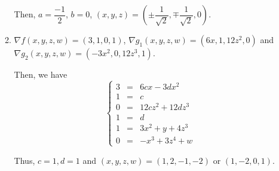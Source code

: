 \documentclass[12pt]{article}
\begin{document}
\begin{enumerate}
\begin{enumerate}
        Then, $a = \dfrac{-1}{2}$, $b = 0$, $(x, y, z) = (\pm \dfrac{1}{\sqrt{2}}, \mp \dfrac{1}{\sqrt{2}}, 0)$.
        
        \item $\nabla f(x, y, z, w) = (3, 1, 0, 1)$, $\nabla g_1(x, y, z, w) = (6x, 1, 12z^2, 0)$ and $\nabla g_2(x, y, z, w) = (-3x^2, 0, 12z^3, 1)$.
        
        Then, we have $$\left\{\begin{matrix}
            3 &=& 6cx -3dx^2\\
            1 &=& c\\
            0 &=& 12cz^2 + 12dz^3\\
            1 &=& d\\
            1 &=& 3x^2 + y + 4z^3\\
            0 &=& -x^3 + 3z^4 + w
        \end{matrix}
        \right.
        $$

        Thus, $c = 1, d = 1$ and $(x, y, z, w) = (1, 2, -1, -2)$ or $(1, -2, 0, 1)$.
    \end{enumerate}
    
\end{enumerate}
\end{document}
